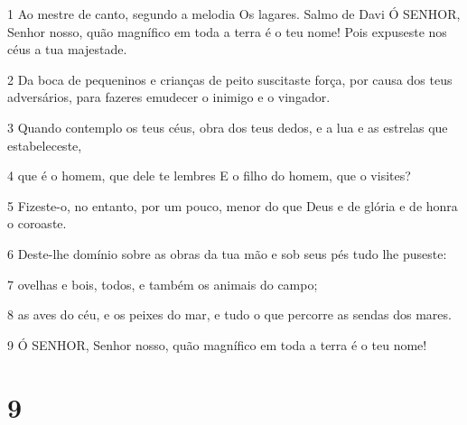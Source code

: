 \par 1 Ao mestre de canto, segundo a melodia Os lagares. Salmo de Davi Ó SENHOR, Senhor nosso, quão magnífico em toda a terra é o teu nome! Pois expuseste nos céus a tua majestade.
\par 2 Da boca de pequeninos e crianças de peito suscitaste força, por causa dos teus adversários, para fazeres emudecer o inimigo e o vingador.
\par 3 Quando contemplo os teus céus, obra dos teus dedos, e a lua e as estrelas que estabeleceste,
\par 4 que é o homem, que dele te lembres E o filho do homem, que o visites?
\par 5 Fizeste-o, no entanto, por um pouco, menor do que Deus e de glória e de honra o coroaste.
\par 6 Deste-lhe domínio sobre as obras da tua mão e sob seus pés tudo lhe puseste:
\par 7 ovelhas e bois, todos, e também os animais do campo;
\par 8 as aves do céu, e os peixes do mar, e tudo o que percorre as sendas dos mares.
\par 9 Ó SENHOR, Senhor nosso, quão magnífico em toda a terra é o teu nome!

\chapter{9}


